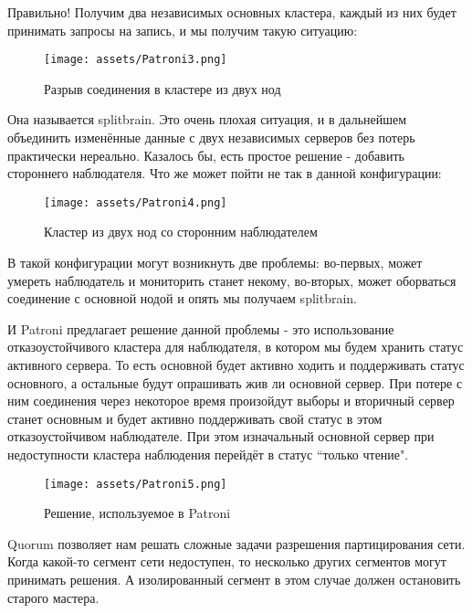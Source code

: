 Правильно! Получим два независимых основных кластера, каждый из них будет принимать запросы на запись, и мы получим такую ситуацию:

\begin{figure}[h]
    \centering
    \texttt{[image: assets/Patroni3.png]}
    \caption{Разрыв соединения в кластере из двух нод}
    \label{fig:mesh5}
\end{figure}

Она называется splitbrain. Это очень плохая ситуация, и в дальнейшем объединить изменённые данные с двух независимых серверов без потерь практически нереально.
Казалось бы, есть простое решение - добавить стороннего наблюдателя.
Что же может пойти не так в данной конфигурации:

\begin{figure}[H]
    \centering
    \texttt{[image: assets/Patroni4.png]}
    \caption{Кластер из двух нод со сторонним наблюдателем}
    \label{fig:mesh6}
\end{figure}

В такой конфигурации могут возникнуть две проблемы: во-первых, может умереть наблюдатель и мониторить станет некому, во-вторых, может оборваться соединение с основной нодой и опять мы получаем splitbrain. 

И Patroni предлагает решение данной проблемы - это использование отказоустойчивого кластера для наблюдателя, в котором мы будем хранить статус активного сервера. То есть основной будет активно ходить и поддерживать статус основного, а остальные будут опрашивать жив ли основной сервер. При потере с ним соединения через некоторое время произойдут выборы и вторичный сервер станет основным и будет активно поддерживать свой статус в этом отказоустойчивом наблюдателе. При этом изначальный основной сервер при недоступности кластера наблюдения перейдёт в статус “только чтение".

\begin{figure}[H]
    \centering
    \texttt{[image: assets/Patroni5.png]}
    \caption{Решение, используемое в Patroni}
    \label{fig:mesh7}
\end{figure}

Quorum позволяет нам решать сложные задачи разрешения партицирования сети. Когда какой-то сегмент сети недоступен, то несколько других сегментов могут принимать решения. А изолированный сегмент в этом случае должен остановить старого мастера. 

